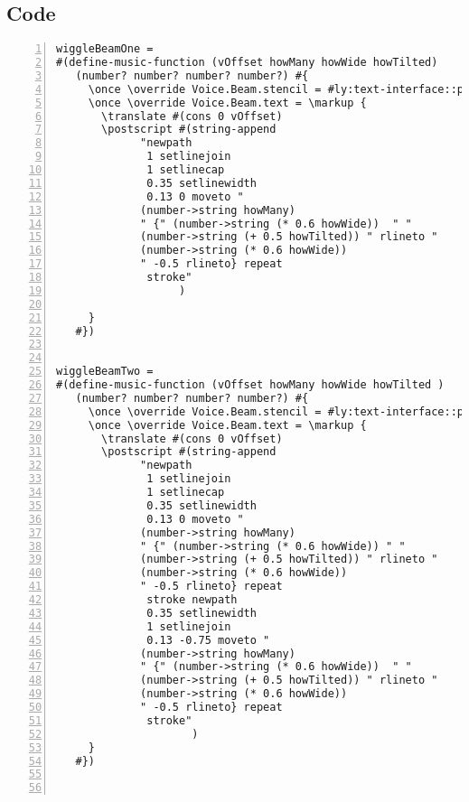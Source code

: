 \subsection{Code}
\begin{Verbatim}[numbers=left,xleftmargin=5mm]
wiggleBeamOne =
#(define-music-function (vOffset howMany howWide howTilted)
   (number? number? number? number?) #{
     \once \override Voice.Beam.stencil = #ly:text-interface::print
     \once \override Voice.Beam.text = \markup {
       \translate #(cons 0 vOffset)
       \postscript #(string-append
             "newpath 
              1 setlinejoin 
              1 setlinecap 
              0.35 setlinewidth
              0.13 0 moveto "
             (number->string howMany)
             " {" (number->string (* 0.6 howWide))  " "
             (number->string (+ 0.5 howTilted)) " rlineto "
             (number->string (* 0.6 howWide))
             " -0.5 rlineto} repeat
              stroke"
                   )

     }
   #})


wiggleBeamTwo =
#(define-music-function (vOffset howMany howWide howTilted )
   (number? number? number? number?) #{
     \once \override Voice.Beam.stencil = #ly:text-interface::print
     \once \override Voice.Beam.text = \markup {
       \translate #(cons 0 vOffset)
       \postscript #(string-append
             "newpath 
              1 setlinejoin 
              1 setlinecap 
              0.35 setlinewidth 
              0.13 0 moveto "
             (number->string howMany)
             " {" (number->string (* 0.6 howWide)) " "
             (number->string (+ 0.5 howTilted)) " rlineto "
             (number->string (* 0.6 howWide))
             " -0.5 rlineto} repeat
              stroke newpath 
              0.35 setlinewidth 
              1 setlinejoin 
              0.13 -0.75 moveto "
             (number->string howMany)
             " {" (number->string (* 0.6 howWide))  " "
             (number->string (+ 0.5 howTilted)) " rlineto "
             (number->string (* 0.6 howWide))
             " -0.5 rlineto} repeat
              stroke"
                     )
     }
   #})



\end{Verbatim}
